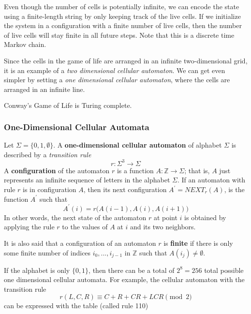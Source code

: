   Even though the number of cells is potentially infinite, we can encode the state using a finite-length string by only keeping track of the live cells. If we initialize the system in a configuration with a finite number of live cells, then the number of live cells will stay finite in all future steps. Note that this is a discrete time Markov chain. 

  Since the cells in the game of life are arranged in an infinite two-dimensional grid, it is an example of a \textit{two dimensional cellular automaton}. We can get even simpler by setting a \textit{one dimensional cellular automaton}, where the cells are arranged in an infinite line. 

  \begin{theorem}
  Conway's Game of Life is Turing complete. 
  \end{theorem}

  \subsubsection{One-Dimensional Cellular Automata}
  \begin{definition}
  Let $\Sigma = \{0, 1, \emptyset\}$. A \textbf{one-dimensional cellular automaton} of alphabet $\Sigma$ is described by a \textit{transition rule}
  \[r: \Sigma^3 \longrightarrow \Sigma\]
  A \textbf{configuration} of the automaton $r$ is a function $A: \mathbb{Z} \longrightarrow \Sigma$; that is, $A$ just represents an infinite sequence of letters in the alphabet $\Sigma$. If an automaton with rule $r$ is in configuration $A$, then its next configuration $A^\prime = NEXT_r (A)$, is the function $A^\prime$ such that 
  \[A^\prime (i) = r\big( A(i-1), A(i), A(i+1)\big)\]
  In other words, the next state of the automaton $r$ at point $i$ is obtained by applying the rule $r$ to the values of $A$ at $i$ and its two neighbors. 

  It is also said that a configuration of an automaton $r$ is \textbf{finite} if there is only some finite number of indices $i_0, ..., i_{j-1}$ in $\mathbb{Z}$ such that $A(i_j) \neq \emptyset$. 
  \end{definition}

  If the alphabet is only $\{0, 1\}$, then there can be a total of $2^8 = 256$ total possible one dimensional cellular automata. For example, the cellular automaton with the transition rule
  \[r(L, C, R) \equiv C + R + CR + LCR \pmod{2}\]
  can be expressed with the table (called rule 110)

